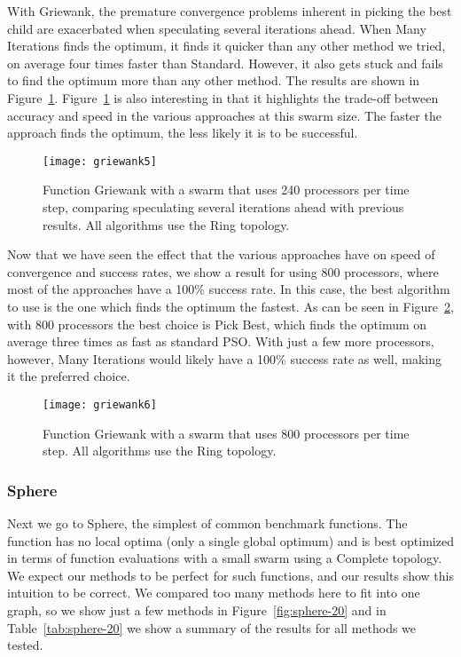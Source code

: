 \documentclass[smallcondensed]{svjour3}
\newcommand{\fig}[1]{Figure~\ref{fig:#1}}
\newcommand{\tabref}[1]{Table~\ref{tab:#1}}
\begin{document}
With Griewank, the premature convergence problems inherent in picking the best
child are exacerbated when speculating several iterations ahead.  When Many
Iterations finds the optimum, it finds it quicker than any other method we
tried, on average four times faster than Standard.  However, it also gets stuck
and fails to find the optimum more than any other method.  The results are
shown in \fig{griewank-manyiters}.   \fig{griewank-manyiters} is also
interesting in that it highlights the trade-off between accuracy and speed in
the various approaches at this swarm size.  The faster the approach finds the
optimum, the less likely it is to be successful.

\begin{figure}
  \centering
  \texttt{[image: griewank5]}
  \caption{Function Griewank with a swarm that uses 240 processors per time
  step, comparing speculating several iterations ahead with previous results.
  All algorithms use the Ring topology.}
  \label{fig:griewank-manyiters}
\end{figure}

Now that we have seen the effect that the various approaches have on speed of
convergence and success rates, we show a result for using 800 processors, where
most of the approaches have a 100\% success rate.  In this case, the best
algorithm to use is the one which finds the optimum the fastest.  As can be
seen in \fig{griewank-800}, with 800 processors the best choice is Pick Best,
which finds the optimum on average three times as fast as standard PSO.  With
just a few more processors, however, Many Iterations would likely have a 100\%
success rate as well, making it the preferred choice.

\begin{figure}
  \centering
  \texttt{[image: griewank6]}
  \caption{Function Griewank with a swarm that uses 800 processors per time
  step.  All algorithms use the Ring topology.}
  \label{fig:griewank-800}
\end{figure}

\subsubsection{Sphere}

Next we go to Sphere, the simplest of common benchmark functions.  The function
has no local optima (only a single global optimum) and is best optimized in
terms of function evaluations with a small swarm using a Complete topology.  We
expect our methods to be perfect for such functions, and our results show this
intuition to be correct.  We compared too many methods here to fit into one
graph, so we show just a few methods in \fig{sphere-20} and in
\tabref{sphere-20} we show a summary of the results for all methods we tested.
\end{document}
